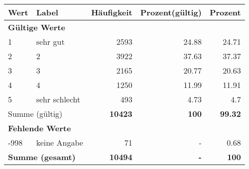     \begin{longtable}{lXrrr}
     \toprule
     \textbf{Wert} & \textbf{Label} & \textbf{Häufigkeit} & \textbf{Prozent(gültig)} & \textbf{Prozent} \\
     \endhead
     \midrule
     \multicolumn{5}{l}{\textbf{Gültige Werte}}\\

     1 &
     \multicolumn{1}{X}{ sehr gut   } &


       \num{2593} &
       \num[round-mode=places,round-precision=2]{24.88} &
         \num[round-mode=places,round-precision=2]{24.71} \\

     2 &
     \multicolumn{1}{X}{ 2   } &


       \num{3922} &
       \num[round-mode=places,round-precision=2]{37.63} &
         \num[round-mode=places,round-precision=2]{37.37} \\

     3 &
     \multicolumn{1}{X}{ 3   } &


       \num{2165} &
       \num[round-mode=places,round-precision=2]{20.77} &
         \num[round-mode=places,round-precision=2]{20.63} \\

     4 &
     \multicolumn{1}{X}{ 4   } &


       \num{1250} &
       \num[round-mode=places,round-precision=2]{11.99} &
         \num[round-mode=places,round-precision=2]{11.91} \\

     5 &
     \multicolumn{1}{X}{ sehr schlecht   } &


       \num{493} &
       \num[round-mode=places,round-precision=2]{4.73} &
         \num[round-mode=places,round-precision=2]{4.7} \\
     \midrule
     \multicolumn{2}{l}{Summe (gültig)} &
       \textbf{\num{10423}} &
     \textbf{\num{100}} &
       \textbf{\num[round-mode=places,round-precision=2]{99.32}} \\
     \multicolumn{5}{l}{\textbf{Fehlende Werte}}\\
       -998 &
       keine Angabe &
         \num{71} &
        - &
         \num[round-mode=places,round-precision=2]{0.68} \\
     \midrule
     \multicolumn{2}{l}{\textbf{Summe (gesamt)}} &
          \textbf{\num{10494}} &
        \textbf{-} &
        \textbf{\num{100}} \\
     \bottomrule
     \end{longtable}
     

